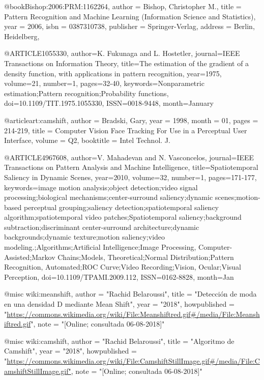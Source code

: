 @book{Bishop:2006:PRM:1162264,
    author = {Bishop, Christopher M.},
    title = {Pattern Recognition and Machine Learning (Information Science and Statistics)},
    year = {2006},
    isbn = {0387310738},
    publisher = {Springer-Verlag},
    address = {Berlin, Heidelberg},
} 

@ARTICLE{1055330,
    author={K. Fukunaga and L. Hostetler},
    journal={IEEE Transactions on Information Theory},
    title={The estimation of the gradient of a density function, with applications in pattern recognition},
    year={1975},
    volume={21},
    number={1},
    pages={32-40},
    keywords={Nonparametric estimation;Pattern recognition;Probability functions},
    doi={10.1109/TIT.1975.1055330},
    ISSN={0018-9448},
    month={January}
}

@article{art:camshift,
    author = {Bradski, Gary},
    year = {1998},
    month = {01},
    pages = {214-219},
    title = {Computer Vision Face Tracking For Use in a Perceptual User Interface},
    volume = {Q2},
    booktitle = {Intel Technol. J.}
}

@ARTICLE{4967608,
    author={V. Mahadevan and N. Vasconcelos},
    journal={IEEE Transactions on Pattern Analysis and Machine Intelligence},
    title={Spatiotemporal Saliency in Dynamic Scenes},
    year={2010},
    volume={32},
    number={1},
    pages={171-177},
    keywords={image motion analysis;object detection;video signal processing;biological mechanisms;center-surround saliency;dynamic scenes;motion-based perceptual grouping;saliency detection;spatiotemporal saliency algorithm;spatiotemporal video patches;Spatiotemporal saliency;background subtraction;discriminant center-surround architecture;dynamic backgrounds;dynamic texture;motion saliency;video modeling.;Algorithms;Artificial Intelligence;Image Processing, Computer-Assisted;Markov Chains;Models, Theoretical;Normal Distribution;Pattern Recognition, Automated;ROC Curve;Video Recording;Vision, Ocular;Visual Perception},
    doi={10.1109/TPAMI.2009.112},
    ISSN={0162-8828},
    month={Jan}
}

@misc{ wiki:meanshift,
    author = "{Rachid Belaroussi}",
    title = "Detección de moda en una densidad D mediante Mean Shift",
    year = "2018",
    howpublished = "\url{https://commons.wikimedia.org/wiki/File:Meanshiftred.gif#/media/File:Meanshiftred.gif}",
    note = "[Online; consultada 06-08-2018]"
}

@misc{ wiki:camshift,
    author = "{Rachid Belaroussi}",
    title = "Algoritmo de Camshift",
    year = "2018",
    howpublished = "\url{https://commons.wikimedia.org/wiki/File:CamshiftStillImage.gif#/media/File:CamshiftStillImage.gif"},
    note = "[Online; consultada 06-08-2018]"
}

